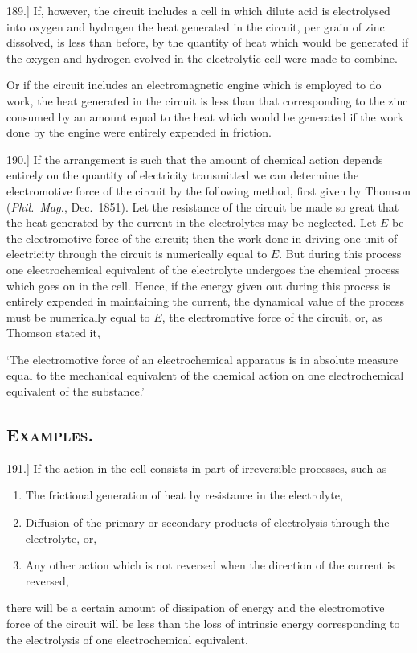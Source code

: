 \documentclass[12pt,oneside]{book}[2021/10/04]
\newcommand{\Heading}{\centering\normalfont}
\newcommand{\Section}[1]{\subsection*{\normalsize\Heading\scshape #1}}
\newcommand{\article}[1]{\phantomsection \label{art:#1}{#1.]}}
\newcommand{\¬}{\hphantom{0}}
\begin{document}
\article{189} If, however, the circuit includes a cell in which dilute
acid is electrolysed into oxygen and hydrogen the heat generated
in the circuit, per grain of zinc dissolved, is less than before, by the
quantity of heat which would be generated if the oxygen and
hydrogen evolved in the electrolytic cell were made to combine.

Or if the circuit includes an electromagnetic engine which is
employed to do work, the heat generated in the circuit is less than
that corresponding to the zinc consumed by an amount equal to
the heat which would be generated if the work done by the engine
were entirely expended in friction.

\article{190} If the arrangement is such that the amount of chemical
action depends entirely on the quantity of electricity transmitted
we can determine the electromotive force of the circuit by the
following method, first given by Thomson (\textit{Phil.\ Mag.}, Dec.\ 1851).
Let the resistance of the circuit be made so great that the heat
generated by the current in the electrolytes may be neglected.
Let \(E\) be the electromotive force of the circuit; then the work
done in driving one unit of electricity through the circuit is
numerically equal to \(E\). But during this process one electrochemical
equivalent of the electrolyte undergoes the chemical
process which goes on in the cell. Hence, if the energy given
out during this process is entirely expended in maintaining the
current, the dynamical value of the process must be numerically
equal to \(E\), the electromotive force of the circuit, or, as Thomson
stated it,

`The electromotive force of an electrochemical apparatus is in
absolute measure equal to the mechanical equivalent of the chemical
action on one electrochemical equivalent of the substance.'

\Section{Examples.}

\article{191} If the action in the cell consists in part of irreversible
processes, such as
\begin{enumerate}[leftmargin=4em, itemindent=-1em, nosep]
  \item The frictional generation of heat by resistance in the electrolyte,
  \item Diffusion of the primary or secondary products of electrolysis
through the electrolyte, or,
  \item Any other action which is not reversed when the direction of
the current is reversed,
\end{enumerate}
there will be a certain amount of dissipation of energy and the
electromotive force of the circuit will be less than the loss of
intrinsic energy corresponding to the electrolysis of one electrochemical
equivalent.
\end{document}
